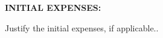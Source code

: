\documentclass[10pt]{article}
\begin{document}
\vspace{15pt}
\noindent \textbf{INITIAL EXPENSES:}

\noindent Justify the initial expenses, if applicable..

\begin{comment}
\pagebreak{}
\noindent \textbf{\uppercase{GASTOS OPERACIONALES: }}

\vspace{15pt}

\begin{center}

\vspace{3pt} \noindent
\begin{tabular}{|p{324pt}|p{35pt}|p{35pt}|p{35pt}|}
\hline
\parbox{324pt}{\raggedright {\textbf{{\small Subitem}} }} 
& \multicolumn{3}{|c|}{\parbox{105pt}{\centering 
\textbf{{\small MONTO (1000 CLP\$)}} }} \\
\cline{2-4} 
 & \parbox{35pt}{\centering \textbf{{\small Año 1}} }
 & \parbox{35pt}{\centering \textbf{{\small Año 2}} }
 & \parbox{35pt}{\centering \textbf{{\small Año 3}} } \\
\hline
\parbox{324pt}{\raggedright {\small Sumistros de Oficina} }
& \parbox{35pt}{\centering } 100
& \parbox{35pt}{\centering } 100
& \parbox{35pt}{\centering } \\
\hline
\parbox{324pt}{\raggedright 
{\small Suministros computacionales}
} & \parbox{35pt}{\centering 1600} & \parbox{35pt}{\centering 1300} & \parbox{35pt}{\centering } \\
\hline
\parbox{324pt}{\raggedright 
{\small Libros, revistas científicas} } 
& \parbox{35pt}{\centering } 
& \parbox{35pt}{\centering 300} 
& \parbox{35pt}{\centering } \\
\hline
\parbox{324pt}{\raggedright {\small Inscripcion Reuniones Cientificas}}
& \parbox{35pt}{\centering 210} 
& \parbox{35pt}{\centering 210} 
& \parbox{35pt}{\centering } \\
\hline
\parbox{324pt}{\raggedright }
& \parbox{35pt}{\centering }
& \parbox{35pt}{\centering }
& \parbox{35pt}{\centering } \\
\hline
\parbox{324pt}{\raggedleft 
\textbf{{\small TOTAL (1000 CLP\$)}} }
& \parbox{35pt}{\centering 1910} 
& \parbox{35pt}{\centering 1910} 
& \parbox{35pt}{\centering } \\
\hline
\end{tabular}
\end{center}


\end{comment}
\end{document}
